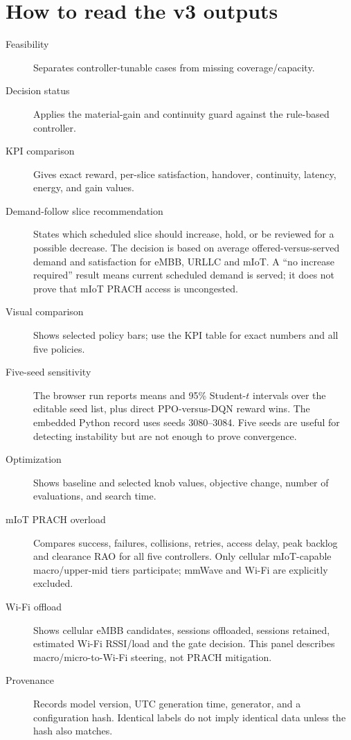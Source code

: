 \documentclass[10pt]{article}
\begin{document}
\section{How to read the v3 outputs}
\begin{description}
  \item[Feasibility] Separates controller-tunable cases from missing coverage/capacity.
  \item[Decision status] Applies the material-gain and continuity guard against the rule-based controller.
  \item[KPI comparison] Gives exact reward, per-slice satisfaction, handover, continuity, latency, energy, and gain values.
  \item[Demand-follow slice recommendation] States which scheduled slice should increase, hold, or be reviewed for a possible decrease. The decision is based on average offered-versus-served demand and satisfaction for eMBB, URLLC and mIoT. A ``no increase required'' result means current scheduled demand is served; it does not prove that mIoT PRACH access is uncongested.
  \item[Visual comparison] Shows selected policy bars; use the KPI table for exact numbers and all five policies.
  \item[Five-seed sensitivity] The browser run reports means and 95\% Student-$t$ intervals over the editable seed list, plus direct PPO-versus-DQN reward wins. The embedded Python record uses seeds 3080--3084. Five seeds are useful for detecting instability but are not enough to prove convergence.
  \item[Optimization] Shows baseline and selected knob values, objective change, number of evaluations, and search time.
  \item[mIoT PRACH overload] Compares success, failures, collisions, retries, access delay, peak backlog and clearance RAO for all five controllers. Only cellular mIoT-capable macro/upper-mid tiers participate; mmWave and Wi-Fi are explicitly excluded.
  \item[Wi-Fi offload] Shows cellular eMBB candidates, sessions offloaded, sessions retained, estimated Wi-Fi RSSI/load and the gate decision. This panel describes macro/micro-to-Wi-Fi steering, not PRACH mitigation.
  \item[Provenance] Records model version, UTC generation time, generator, and a configuration hash. Identical labels do not imply identical data unless the hash also matches.
\end{description}
\end{document}
